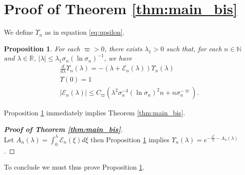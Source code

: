 \documentclass{amsart}
\numberwithin{equation}{section}
\newtheorem{prop}[thm]{Proposition}
\newcommand\cE{{\mathcal E}}
\newcommand\bN{{\mathbb N}}
\newcommand\bR{{\mathbb R}}
\begin{document}
\section{Proof of Theorem \ref{thm:main_bis}}\label{sec:complex_PF}
We define $\Upsilon_n$ as in equation \eqref{eq:upsilon}.
\begin{prop}\label{prop:diff2}
For each $\varpi>0$, there exists $\lambda_1>0$ such that, for each $n\in\bN$ and $\lambda\in\bR$, $|\lambda|\leq \lambda_1\sigma_n (\ln\sigma_n)^{-1}$, we have
\[
\begin{split}
&\frac{d}{d\lambda}\Upsilon_n(\lambda)=- \left(\lambda+\cE_n(\lambda)\right)\Upsilon_n(\lambda) \\
&\Upsilon(0)=1\\
&\left|\cE_n(\lambda)\right|\leq C_\varpi \left(\lambda^2\sigma_n^{-3}(\ln\sigma_n)^2 n+n\sigma_n^{-\varpi}\right).
\end{split}
\]

\end{prop}
Proposition \ref{prop:diff2} immediately implies Theorem \ref{thm:main_bis}.
\begin{proof}[\bf \em  Proof of Theorem \ref{thm:main_bis}]\ \\
Let $A_n(\lambda)=\int_0^\lambda\cE_n(\xi) d\xi$ then Proposition \ref{prop:diff2} implies $\Upsilon_n(\lambda)=e^{-\frac{\lambda^2}2-A_n(\lambda)}$.
\end{proof}
To conclude we must thus prove Proposition \ref{prop:diff2}.
\end{document}
